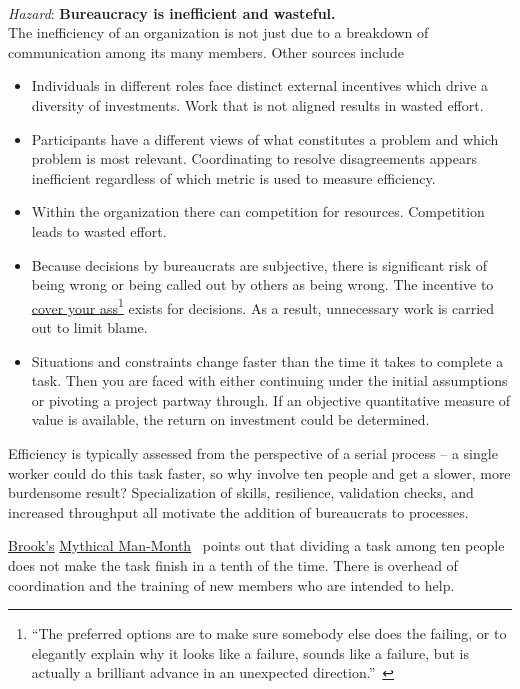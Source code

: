 \ \\
\textit{Hazard}: \textbf{Bureaucracy is inefficient and wasteful.}\\
The inefficiency of an organization is not just due to a breakdown of communication among its many members. Other sources include 
\begin{itemize}
    \item Individuals in different roles face distinct external incentives which drive a diversity of investments. Work that is not aligned results in wasted effort.
    \item Participants have a different views of what constitutes a problem and which problem is most relevant. Coordinating to resolve disagreements appears inefficient regardless of which metric is used to measure efficiency.
    \item Within the organization there can competition  for resources. Competition leads to wasted effort.
    \item Because decisions by bureaucrats are subjective, there is significant risk of being wrong or being called out by others as being wrong. The incentive to 
\href{https://en.wikipedia.org/wiki/Cover_your_ass}{cover your ass}\footnote{``The 
preferred options are to make sure somebody else does the failing, or to elegantly explain why it looks like a failure, sounds like a failure, but is actually a brilliant advance in an unexpected direction.''~\cite{1996_unknown}}
\iftoggle{WPinmargin}{\marginpar{$>$Wikipedia: Cover\\your ass}}{}
exists for decisions. As a result, unnecessary work is carried out to limit blame. 
\item Situations and constraints change faster than the time it takes to complete a task.  Then you are faced with either continuing under the initial assumptions or pivoting a project partway through. If an objective quantitative measure of value is available, the return on investment could be determined.
\end{itemize}


Efficiency is typically assessed from the perspective of a serial process -- a single worker could do this task faster, so why involve ten people and get a slower, more burdensome result? Specialization of skills, resilience, validation checks, and increased throughput all  motivate the addition of bureaucrats to processes.

\href{https://en.wikipedia.org/wiki/Fred_Brooks}{Brook's} 
\href{https://en.wikipedia.org/wiki/The_Mythical_Man-Month}{Mythical Man-Month}~\cite{1975_brooks} points 
out that dividing a task among ten people does not make the task finish in a tenth of the time. There is overhead of coordination and the training of new members who are intended to help. 

